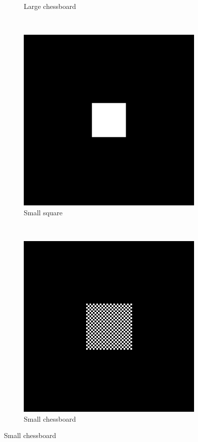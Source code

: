 \documentclass[journal]{IEEEtran}
\begin{document}
\begin{figure} [ht]
\begin{center}
\begin{subfigure}{0.2\textwidth}
			\caption{Large chessboard}
			\label{subfig:b}
		\end{subfigure}	
		\\
		\begin{subfigure}{0.2\textwidth}
			\includegraphics[scale=0.2]{square_small}
			\caption{Small square}
			\label{subfig:c}
		\end{subfigure}		
		~
		\begin{subfigure}{0.2\textwidth}
			\includegraphics[scale=0.2]{checker_fine_small}
			\caption{Small chessboard}
			\label{subfig:d}
		\end{subfigure}	
	

\end{center}
\end{figure}
\end{document}
